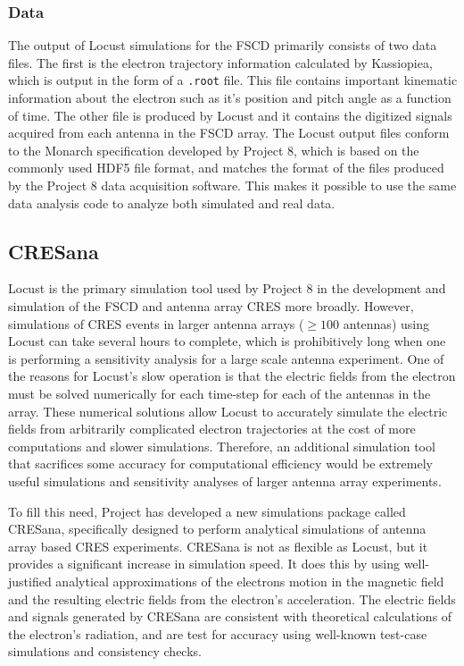 \subsubsection*{Data}

The output of Locust simulations for the FSCD primarily consists of two data files. The first is the electron trajectory information calculated by Kassiopiea, which is output in the form of a \texttt{.root} file. This file contains important kinematic information about the electron such as it's position and pitch angle as a function of time. The other file is produced by Locust and it contains the digitized signals acquired from each antenna in the FSCD array. The Locust output files conform to the Monarch specification developed by Project 8, which is based on the commonly used HDF5 file format, and matches the format of the files produced by the Project 8 data acquisition software. This makes it possible to use the same data analysis code to analyze both simulated and real data.

\subsection{CRESana}

Locust is the primary simulation tool used by Project 8 in the development and simulation of the FSCD and antenna array CRES more broadly. However, simulations of CRES events in larger antenna arrays ($\geq100$ antennas) using Locust can take several hours to complete, which is prohibitively long when one is performing a sensitivity analysis for a large scale antenna experiment. One of the reasons for Locust's slow operation is that the electric fields from the electron must be solved numerically for each time-step for each of the antennas in the array. These numerical solutions allow Locust to accurately simulate the electric fields from arbitrarily complicated electron trajectories at the cost of more computations and slower simulations. Therefore, an additional simulation tool that sacrifices some accuracy for computational efficiency would be extremely useful simulations and sensitivity analyses of larger antenna array experiments.

To fill this need, Project has developed a new simulations package called CRESana, specifically designed to perform analytical simulations of antenna array based CRES experiments. CRESana is not as flexible as Locust, but it provides a significant increase in simulation speed. It does this by using well-justified analytical approximations of the electrons motion in the magnetic field and the resulting electric fields from the electron's acceleration. The electric fields and signals generated by CRESana are consistent with theoretical calculations of the electron's radiation, and are test for accuracy using well-known test-case simulations and consistency checks. 

